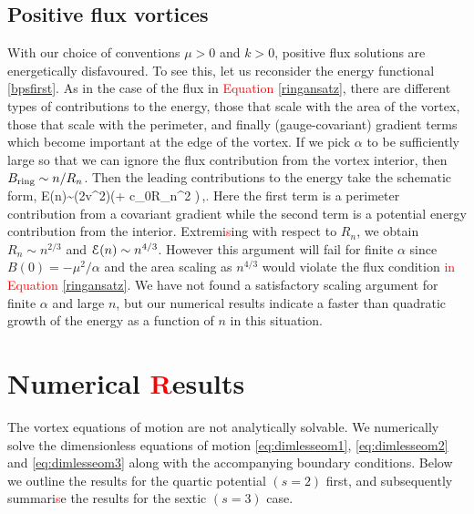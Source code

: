 \subsection{Positive flux vortices}
With our choice of conventions  $\mu >0$ and $k>0$, positive flux solutions are energetically disfavoured. To see this, let us  reconsider the energy functional \eqref{bpsfirst}.  As in the case of the flux in \textcolor{red}{Equation} \eqref{ringansatz}, there are different types of contributions to the energy, those that scale with the area of the vortex, those that scale with the perimeter, and finally (gauge-covariant) gradient  terms which become important at the edge of the vortex.
If we pick $\alpha$ to be sufficiently large so that we can ignore the flux contribution from the vortex interior, then 
$B_{\rm ring}\sim n/R_n$. Then the leading contributions to the energy take the schematic form,
\be
{\cal E}(n)\sim (2\pi v^2)\left(\Delta + c_0\pi R_n^2 \right)\,,\qquad \alpha{}\textcolor{red}{.}
\ee
Here the first term is a perimeter contribution from a covariant gradient while the second term is a potential energy contribution from the interior. Extremi\textcolor{red}{s}ing with respect to $R_n$, we obtain $R_n\sim n^{2/3}$ and ${\cal E}(n)\sim n^{4/3}$.
However this argument will fail for  finite $\alpha$ since $B(0)=-\mu^2/\alpha$ and the area scaling as $n^{4/3}$ would violate  the flux condition \textcolor{red}{in Equation} \eqref{ringansatz}.  We have not found a satisfactory scaling argument for finite $\alpha$ and large $n$, but our numerical results indicate a faster than quadratic growth of the energy as a function of $n$ in this situation.


%

\section{Numerical \textcolor{red}{R}esults} \label{sec:Numerical_Results_vortex}
The vortex equations of motion are not analytically solvable. We numerically solve the dimensionless equations of motion \eqref{eq:dimlesseom1}, \eqref{eq:dimlesseom2} and \eqref{eq:dimlesseom3} along with the accompanying boundary conditions. Below we outline the results for the quartic potential $(s=2)$ first, and subsequently  summari\textcolor{red}{s}e the results for the sextic $(s=3)$ case.
